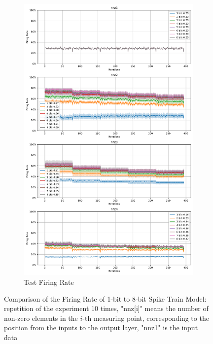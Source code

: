     \begin{figure}[!htpb]
        \ContinuedFloat
        \begin{subfigure}[H]{0.9\textwidth}
            \centering
            \includegraphics[width=\textwidth]{../standard/FashionMNIST/plots/fashionmnist_test_firerate.pdf}
            \caption{Test Firing Rate}
        \end{subfigure}
        \caption{Comparison of the Firing Rate of 1-bit to 8-bit Spike Train Model: repetition of the experiment 10 times, "nnz[i]" means the number of non-zero elements in the $i$-th measuring point, corresponding to the position from the inputs to the output layer, "nnz1" is the input data}
        \label{fig:firing_rate}
    \end{figure}

